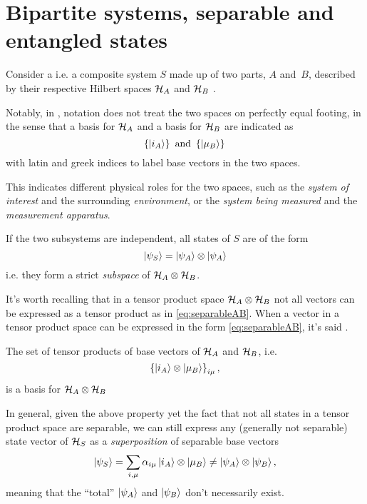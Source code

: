 \section{Bipartite systems, separable and entangled states}

Consider a 
i.e. a composite system $S$
made up of two parts, $A$ and~$B$,
described by their respective Hilbert spaces
$\mathcal{H}_A$ and $\mathcal{H}_B$ \parencite{Haroche_Exploring}.

Notably, in \cite{Haroche_Exploring},
notation does not treat the two spaces
on perfectly equal footing,
in the sense that a basis for $\mathcal{H}_A$ and a basis for $\mathcal{H}_B$
are indicated as
$$
  \left\{\ket{i_A}\right\} \text{ and } \left\{\ket{\mu_B}\right\}\,
$$
with latin and greek indices to label base vectors in the two spaces.

This indicates different physical roles for the two spaces,
such as the \emph{system of interest} and the surrounding \emph{environment},
or the \emph{system being measured} and the \emph{measurement apparatus}.

If the two subsystems are independent, all states of $S$ are of the form
\begin{equation}\label{eq:separableAB}
  \ket{\psi_S} = \ket{\psi_A}\otimes\ket{\psi_A}
\end{equation}
i.e. they form a strict \emph{subspace} of $\mathcal{H}_A\otimes\mathcal{H}_B$.

It's worth recalling that in a tensor product space $\mathcal{H}_A\otimes\mathcal{H}_B$
not all vectors can be expressed as a tensor product as in \eqref{eq:separableAB}.
When a vector in a tensor product space
can be expressed in the form \eqref{eq:separableAB},
it's said  \parencite{Nakahara}.

\begin{proposition}\label{TensorBase}
The set of tensor products of base vectors of $\mathcal{H}_A$ and $\mathcal{H}_B$,
i.e. $$\left\{\ket{i_A} \otimes \ket{\mu_B}\right\}_{i\mu},$$
is a basis for $\mathcal{H}_A \otimes \mathcal{H}_B$
\end{proposition}

In general, given the above property yet the fact that not all states
in a tensor product space are separable, we can still express any
(generally not separable) state vector of $\mathcal{H}_S$
as a \emph{superposition} of separable base vectors
\begin{equation}\label{eq:bipartite_expansion}
  \ket{\psi_S} = \sum_{i, \mu}\alpha_{i\mu}\ket{i_A}\otimes\ket{\mu_B} \neq \ket{\psi_A}\otimes\ket{\psi_B},
\end{equation}
meaning that the
``total'' $\ket{\psi_A}$ and $\ket{\psi_B}$ don't necessarily exist.

